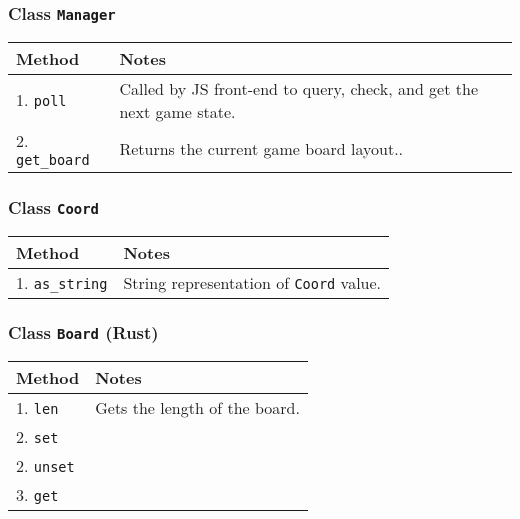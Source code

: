 \documentclass[11pt]{article}
\begin{document}
\subsubsection{Class \texttt{Manager}}
\label{sec:org72c7423}
\begin{center}
\begin{tabular}{|l|l|}
Method & Notes\\
\hline
1. \texttt{poll} & Called by JS front-end to query, check, and get the next game state.\\
2. \texttt{get\_board} & Returns the current game board layout..\\
\end{tabular}
\end{center}
\subsubsection{Class \texttt{Coord}}
\label{sec:orgd8c2aa0}
\begin{center}
\begin{tabular}{|l|l|}
Method & Notes\\
\hline
1. \texttt{as\_string} & String representation of \texttt{Coord} value.\\
\end{tabular}
\end{center}
\subsubsection{Class \texttt{Board} (Rust)}
\label{sec:org6e880aa}
\begin{center}
\begin{tabular}{|l|l|}
Method & Notes\\
\hline
1. \texttt{len} & Gets the length of the board.\\
2. \texttt{set} & \\
2. \texttt{unset} & \\
3. \texttt{get} & \\
\end{tabular}
\end{center}
\end{document}
